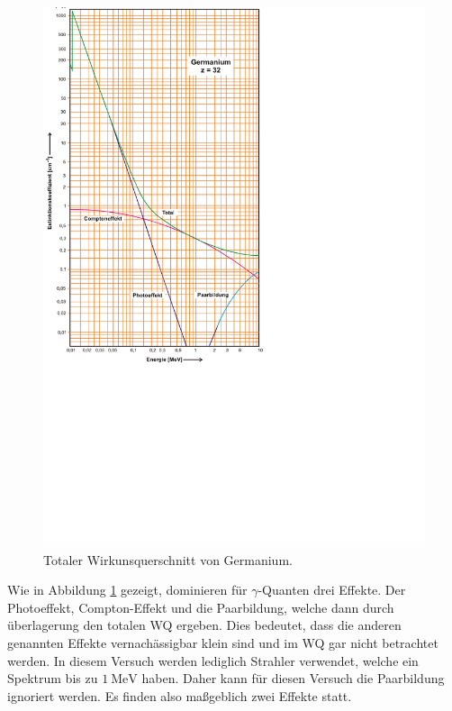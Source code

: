 \begin{figure}
    \centering
    \includegraphics[height = \textheight]{content/pics/wq_germanium.pdf}
    \caption{Totaler Wirkunsquerschnitt von Germanium.}
    \label{fig:germanium_wq}
\end{figure}

Wie in Abbildung \ref{fig:germanium_wq} gezeigt, dominieren für $\gamma$-Quanten drei Effekte. Der Photoeffekt, Compton-Effekt und die Paarbildung, welche dann durch überlagerung 
den totalen WQ ergeben. Dies bedeutet, dass die anderen genannten Effekte vernachässigbar klein sind und im WQ gar nicht betrachtet werden. In diesem Versuch werden lediglich 
Strahler verwendet, welche ein Spektrum bis zu $\qty{1}{\mega\electronvolt}$ haben. Daher kann für diesen Versuch die Paarbildung ignoriert werden. Es finden also maßgeblich 
zwei Effekte statt.

